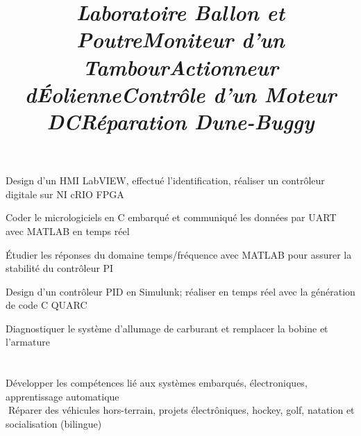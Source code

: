 \documentclass[mm]{res}
\begin{document}
\begin{resume}
\title{\textsl{Laboratoire Ballon et Poutre}}
\begin{position}
\tb Design d'un HMI LabVIEW, effectu\'e l'identification, r\'ealiser un contr\^oleur digitale sur NI cRIO FPGA
\end{position}

\title{\textsl{Moniteur d'un Tambour}}
\begin{position}
\tb Coder le micrologiciels en C embarqu\'e et communiqu\'e les donn\'ees par UART avec MATLAB en temps r\'eel
\end{position}

\title{\textsl{Actionneur d\textquotesingle \'Eolienne}}
\begin{position}
\tb \'Etudier les r\'eponses du domaine temps/fr\'equence avec MATLAB pour assurer la stabilit\'e du contr\^oleur PI
\end{position}

\title{\textsl{Contr\^ole d'un Moteur DC}}
\begin{position}
\tb Design d'un contr\^oleur PID en Simulunk; r\'ealiser en temps r\'eel avec la g\'en\'eration de code C QUARC
\end{position}

\title{\textsl{R\'eparation Dune-Buggy}}
\begin{position}
\tb Diagnostiquer le syst\`eme d'allumage de carburant et remplacer la bobine et l'armature
\end{position}


\toprule

\section{\headinginterests}
\tb D\'evelopper les comp\'etences li\'e aux syst\`emes embarqu\'es, \'electroniques, apprentissage automatique \\
􏰚\tb R\'eparer des v\'ehicules hors-terrain, projets \'electr\^oniques, hockey, golf, natation et socialisation (bilingue)

\end{resume}
\end{document}
